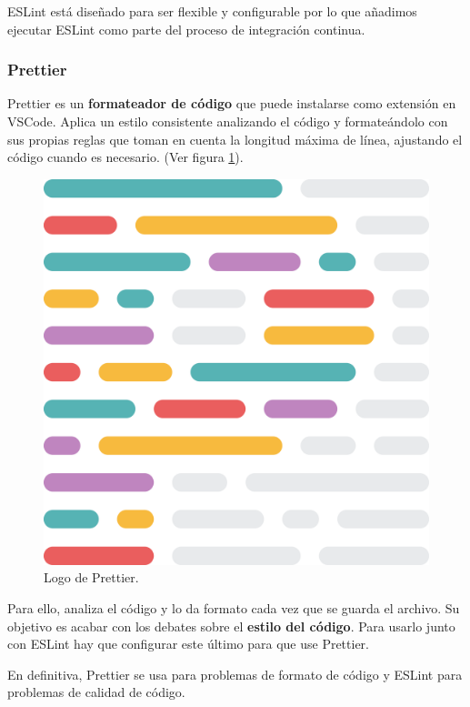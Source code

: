 \documentclass[12pt,twoside,titlepage]{report}
\begin{document}
ESLint está diseñado para ser flexible y configurable por lo que añadimos ejecutar ESLint como parte del proceso de integración continua.

\subsubsection{Prettier}

Prettier es un \textbf{formateador de código} que puede instalarse como extensión en VSCode. Aplica un estilo consistente analizando el código y formateándolo con sus propias reglas que toman en cuenta la longitud máxima de línea, ajustando el código cuando es necesario.
(Ver figura \ref{fig:PrettierLogo}).

\begin{figure}[H]
    \centering
    \includegraphics[scale=0.02]{VSCode/Prettier}
    \caption{Logo de Prettier.}
    \label{fig:PrettierLogo}
\end{figure}

Para ello, analiza el código y lo da formato cada vez que se guarda el archivo. Su objetivo es acabar con los debates sobre el \textbf{estilo del código}. Para usarlo junto con ESLint hay que configurar este último para que use Prettier.

En definitiva, Prettier se usa para problemas de formato de código y ESLint para problemas de calidad de código.
\end{document}
